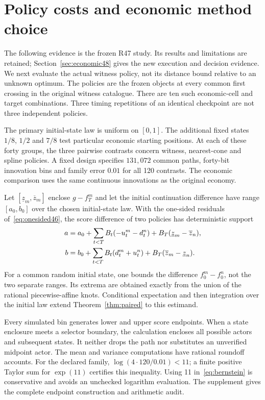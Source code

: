 \section{Policy costs and economic method choice}\label{sec:direct47}

The following evidence is the frozen R47 study. Its results and limitations are retained; Section~\ref{sec:economic48} gives the new execution and decision evidence.
We next evaluate the actual witness policy, not its distance bound relative to an unknown optimum. The policies are the frozen objects at every common first crossing in the original witness catalogue. There are ten such economic-cell and target combinations. Three timing repetitions of an identical checkpoint are not three independent policies.

The primary initial-state law is uniform on $[0,1]$. The additional fixed states $1/8$, $1/2$ and $7/8$ test particular economic starting positions. At each of these forty groups, the three pairwise contrasts concern witness, nearest-cone and spline policies. A fixed design specifies $131{,}072$ common paths, forty-bit innovation bins and family error $0.01$ for all 120 contrasts. The economic comparison uses the same continuous innovations as the original economy.

Let $[\underline z_m,\overline z_m]$ enclose $g-f_T^m$ and let the initial continuation difference have range $[a_0,b_0]$ over the chosen initial-state law. With the one-sided residuals of~\eqref{eq:onesided46}, the score difference of two policies has deterministic support
\begin{align}\label{eq:directsupport47}
 a&=a_0+\sum_{t<T}B_t(-u_t^m-d_t^n)
                  +B_T(\underline z_m-\overline z_n),\\
 b&=b_0+\sum_{t<T}B_t(d_t^m+u_t^n)
                  +B_T(\overline z_m-\underline z_n).\notag
\end{align}
For a common random initial state, one bounds the difference $f_0^m-f_0^n$, not the two separate ranges. Its extrema are obtained exactly from the union of the rational piecewise-affine knots. Conditional expectation and then integration over the initial law extend Theorem~\ref{thm:paired} to this estimand.

Every simulated bin generates lower and upper score endpoints. When a state enclosure meets a selector boundary, the calculation encloses all possible actors and subsequent states. It neither drops the path nor substitutes an unverified midpoint actor. The mean and variance computations have rational roundoff accounts. For the declared family, $\log(4\cdot120/0.01)<11$; a finite positive Taylor sum for $\exp(11)$ certifies this inequality. Using 11 in~\eqref{eq:bernstein} is conservative and avoids an unchecked logarithm evaluation. The supplement gives the complete endpoint construction and arithmetic audit.

